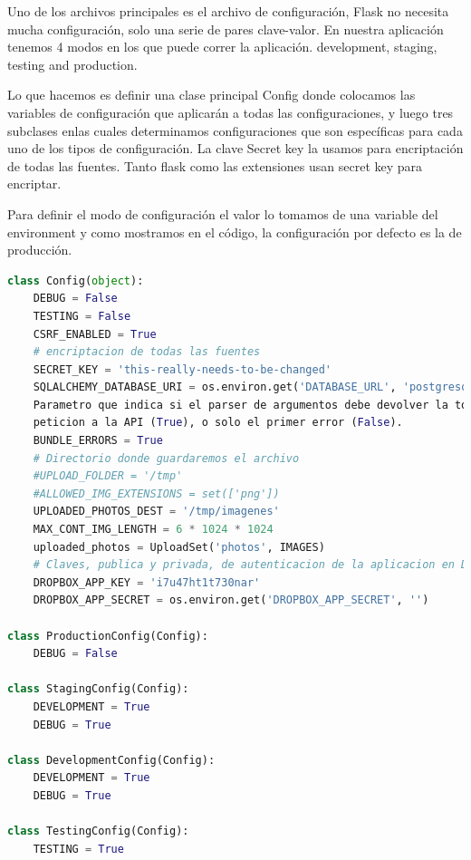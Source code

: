 Uno de los archivos principales es el archivo de configuración, Flask no necesita mucha configuración, solo una serie de pares clave-valor. En nuestra aplicación tenemos 4 modos en los que puede correr la aplicación. development, staging, testing and production.

Lo que hacemos es definir una clase principal Config donde colocamos las variables de configuración que aplicarán a todas las configuraciones, y luego tres subclases enlas cuales determinamos configuraciones que son específicas para cada uno de los tipos de configuración. La clave Secret key la usamos para encriptación de todas las fuentes. Tanto flask como las extensiones usan secret key para encriptar.

Para definir el modo de configuración el valor lo tomamos de una variable del environment y como mostramos en el código, la configuración por defecto es la de producción.
    
\begin{lstlisting}[language=Python]
class Config(object):
    DEBUG = False
    TESTING = False
    CSRF_ENABLED = True
    # encriptacion de todas las fuentes
    SECRET_KEY = 'this-really-needs-to-be-changed'
    SQLALCHEMY_DATABASE_URI = os.environ.get('DATABASE_URL', 'postgresql:///salud_dev?client_encoding=utf8')
    Parametro que indica si el parser de argumentos debe devolver la totalidad de los errores encontrados en una
    peticion a la API (True), o solo el primer error (False).
    BUNDLE_ERRORS = True
    # Directorio donde guardaremos el archivo
    #UPLOAD_FOLDER = '/tmp'
    #ALLOWED_IMG_EXTENSIONS = set(['png'])
    UPLOADED_PHOTOS_DEST = '/tmp/imagenes'
    MAX_CONT_IMG_LENGTH = 6 * 1024 * 1024
    uploaded_photos = UploadSet('photos', IMAGES)
    # Claves, publica y privada, de autenticacion de la aplicacion en Dropbox.
    DROPBOX_APP_KEY = 'i7u47ht1t730nar'
    DROPBOX_APP_SECRET = os.environ.get('DROPBOX_APP_SECRET', '')

class ProductionConfig(Config):
    DEBUG = False

class StagingConfig(Config):
    DEVELOPMENT = True
    DEBUG = True
    
class DevelopmentConfig(Config):
    DEVELOPMENT = True
    DEBUG = True
    
class TestingConfig(Config):
    TESTING = True
\end{lstlisting}

